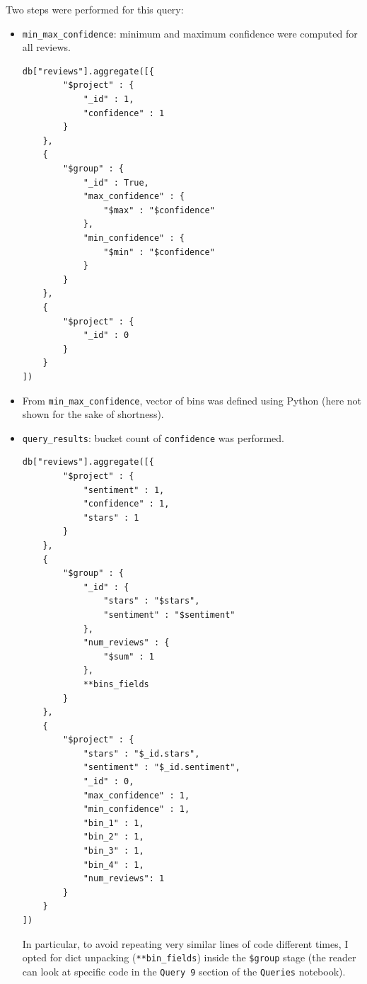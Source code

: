 \documentclass{Configuration_Files/PoliMi3i_thesis}
\begin{document}
Two steps were performed for this query:
\begin{itemize}
\item \texttt{min\_max\_confidence}: minimum and maximum confidence were computed for all reviews. 

\bigskip

\begin{lstlisting}[style = mongodb]
    db["reviews"].aggregate([{
        "$project" : {
            "_id" : 1,
            "confidence" : 1
        }
    },
    {
        "$group" : {
            "_id" : True,
            "max_confidence" : {
                "$max" : "$confidence"
            },
            "min_confidence" : {
                "$min" : "$confidence"
            }
        }
    },
    {
        "$project" : {
            "_id" : 0
        }
    }
])
\end{lstlisting}

\bigskip

\item From \texttt{min\_max\_confidence}, vector of bins was defined using Python (here not shown for the sake of shortness).

\item \texttt{query\_results}: bucket count of \texttt{confidence} was performed.

\bigskip

\begin{lstlisting}[style = mongodb]
db["reviews"].aggregate([{
        "$project" : {
            "sentiment" : 1,
            "confidence" : 1,
            "stars" : 1
        }
    },
    {
        "$group" : {
            "_id" : {
                "stars" : "$stars",
                "sentiment" : "$sentiment"
            },
            "num_reviews" : {
                "$sum" : 1
            },
            **bins_fields
        }
    },
    {
        "$project" : {
            "stars" : "$_id.stars",
            "sentiment" : "$_id.sentiment",
            "_id" : 0,
            "max_confidence" : 1,
            "min_confidence" : 1,
            "bin_1" : 1,
            "bin_2" : 1, 
            "bin_3" : 1,
            "bin_4" : 1,
            "num_reviews": 1
        }
    }
])
\end{lstlisting}

\bigskip

In particular, to avoid repeating very similar lines of code different times, I opted for dict unpacking (\texttt{**bin\_fields}) inside the \texttt{\$group} stage (the reader can look at specific code in the \texttt{Query 9} section of the \texttt{Queries} notebook).

\end{itemize}
\end{document}
